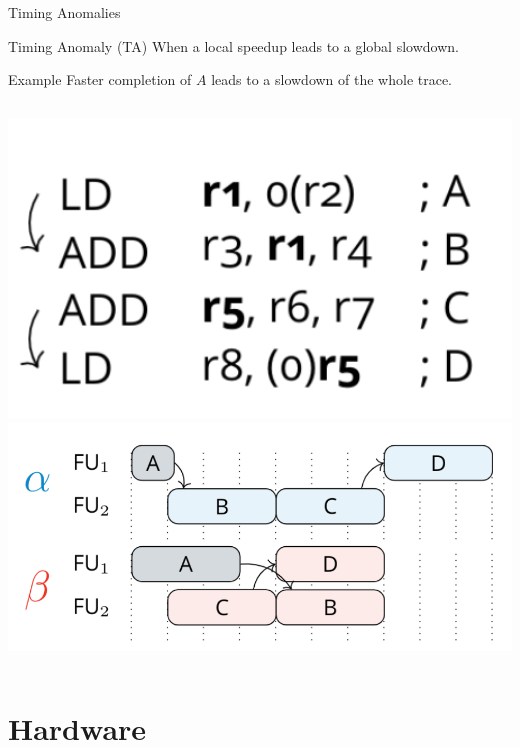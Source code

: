 \documentclass{beamer}
\begin{document}
\begin{frame}{Timing Anomalies}
    \begin{block}{Timing Anomaly (TA)}
        When a local speedup leads to a global slowdown.
    \end{block}

    \begin{exampleblock}{Example}
        Faster completion of $A$ leads to a slowdown of the whole trace. 
    \end{exampleblock}

    \begin{columns}
        \includegraphics[width=1\textwidth]{pic/first-TA-ex-input.png}
        \includegraphics[width=1\textwidth]{pic/first-TA-ex-trace.png}
    \end{columns}
    
\end{frame}
    
\section{Hardware}
\end{document}
